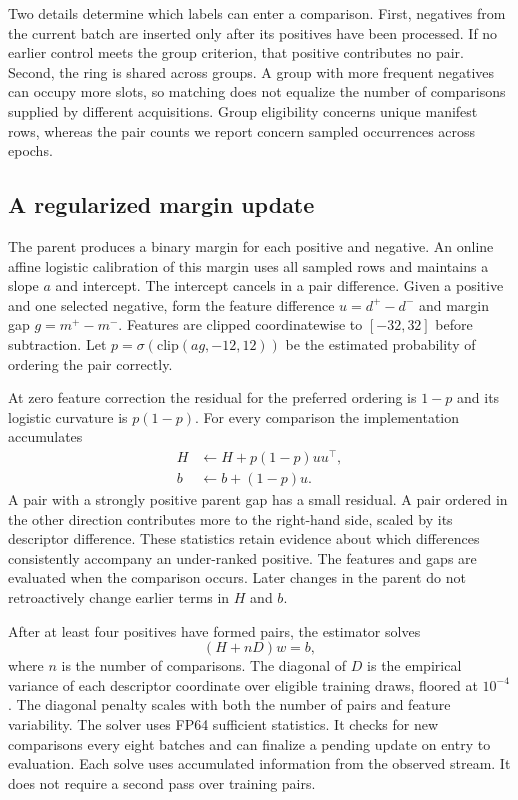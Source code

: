 \documentclass{article}
\begin{document}
Two details determine which labels can enter a comparison. First, negatives from the current batch are inserted only after its positives have been processed. If no earlier control meets the group criterion, that positive contributes no pair. Second, the ring is shared across groups. A group with more frequent negatives can occupy more slots, so matching does not equalize the number of comparisons supplied by different acquisitions. Group eligibility concerns unique manifest rows, whereas the pair counts we report concern sampled occurrences across epochs.

\subsection{A regularized margin update}
The parent produces a binary margin for each positive and negative. An online affine logistic calibration of this margin uses all sampled rows and maintains a slope $a$ and intercept. The intercept cancels in a pair difference. Given a positive and one selected negative, form the feature difference $u=d^+-d^-$ and margin gap $g=m^+-m^-$. Features are clipped coordinatewise to $[-32,32]$ before subtraction. Let $p=\sigma(\mathrm{clip}(ag,-12,12))$ be the estimated probability of ordering the pair correctly.

At zero feature correction the residual for the preferred ordering is $1-p$ and its logistic curvature is $p(1-p)$. For every comparison the implementation accumulates
\begin{align}
  H &\leftarrow H + p(1-p)uu^\top,\label{eq:gram}\\
  b &\leftarrow b + (1-p)u.\label{eq:rhs}
\end{align}
A pair with a strongly positive parent gap has a small residual. A pair ordered in the other direction contributes more to the right-hand side, scaled by its descriptor difference. These statistics retain evidence about which differences consistently accompany an under-ranked positive. The features and gaps are evaluated when the comparison occurs. Later changes in the parent do not retroactively change earlier terms in $H$ and $b$.

After at least four positives have formed pairs, the estimator solves
\begin{equation}
    (H+nD)w=b,\label{eq:solve}
\end{equation}
where $n$ is the number of comparisons. The diagonal of $D$ is the empirical variance of each descriptor coordinate over eligible training draws, floored at $10^{-4}$. The diagonal penalty scales with both the number of pairs and feature variability. The solver uses FP64 sufficient statistics. It checks for new comparisons every eight batches and can finalize a pending update on entry to evaluation. Each solve uses accumulated information from the observed stream. It does not require a second pass over training pairs.
\end{document}
